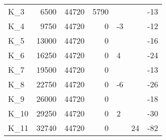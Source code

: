 \begin{tabular}{lrrrllr}
K\_3 & 6500 & 44720 & 5790 &  &  & -13 \\
K\_4 & 9750 & 44720 & 0 & -3 &  & -12 \\
K\_5 & 13000 & 44720 & 0 &  &  & -16 \\
K\_6 & 16250 & 44720 & 0 & 4 &  & -24 \\
K\_7 & 19500 & 44720 & 0 &  &  & -13 \\
K\_8 & 22750 & 44720 & 0 & -6 &  & -26 \\
K\_9 & 26000 & 44720 & 0 &  &  & -18 \\
K\_10 & 29250 & 44720 & 0 & 2 &  & -30 \\
K\_11 & 32740 & 44720 & 0 &  & 24 & -82 \\
\bottomrule
\end{tabular}
